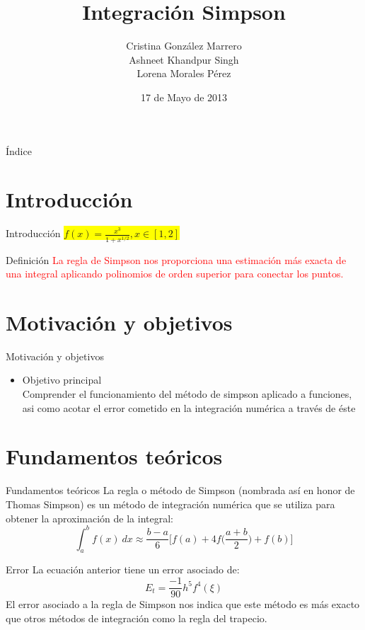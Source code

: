 \documentclass{beamer}
\title[Universidad de la Laguna]{Integración Simpson}
\author[]{Cristina González Marrero\\
          Ashneet Khandpur Singh\\
          Lorena Morales Pérez}
\institute{Grupo 2-G}
\date{17 de Mayo de 2013}
\begin{document}
 
 \begin{frame}
   \titlepage
 \end{frame}


\begin{frame}{Índice}
  \tableofcontents[pausesections]
\end{frame}

\section{Introducción}
\begin{frame}{Introducción}
  \hskip 4cm{\colorbox{yellow}{$f(x)=\frac{x^3}{1+x^{1/2}}, x \in [1, 2]$}}
  \vskip 1cm
  \begin{block}{Definición}
    \textcolor{red}{La regla de Simpson nos proporciona una estimación más exacta  de una integral aplicando polinomios de orden superior para conectar los puntos.}
  \end{block}
\end{frame}

\section{Motivación y objetivos}
\begin{frame}{Motivación y objetivos}
  \begin{itemize}
    \item Objetivo principal\\
    \vskip 0.5cm
    \parindent 0.5cm Comprender el funcionamiento del método de simpson aplicado a funciones, asi como acotar el error cometido en la integración numérica a través de éste
  \end{itemize}
\end{frame}
 

\section{Fundamentos teóricos}
\begin{frame}{Fundamentos teóricos}
La regla o método de Simpson (nombrada así en honor de Thomas Simpson) es un método de integración numérica que se utiliza para obtener la aproximación de la integral:
\[\int_a^{b}f(x) \: dx \approx \frac{b-a}{6} \Bigg[f(a)+4f\Big(\frac{a+b}{2}\Big)+f(b)\Bigg]\]
\end{frame}

\begin{frame}{Error}
La ecuación anterior tiene un error asociado de:
 \[E_t = \frac{-1}{90}h^5 f^4(\xi)\]
El error asociado a la regla de Simpson nos indica que este método es más exacto que otros métodos de integración como la regla del trapecio.\end{frame}
\end{document}
